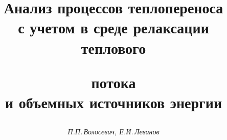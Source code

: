 




%





\newcommand{\Grad}{\operatorname{grad}}


\newcommand{\const}{\operatorname{const}}


\renewcommand{\baselinestretch}{0.98}


\newcommand{\tts}[1]{}







\setcounter{page}{38}















\author{\it П.П.\,Волосевич, Е.И.\,Леванов}




\title{Анализ процессов теплопереноса\\ с учетом в среде релаксации теплового


потока\\ и объемных источников энергии}





\date{}




\pagestyle{plain} %







\maketitle


